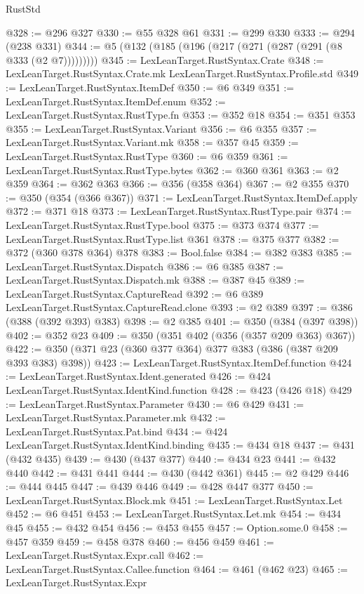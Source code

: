 \begin{lexlean}{RustStd}
\begin{coremodule}
{\begin{coremodule}
{{{{{{{{{{{{@328 := @296 @327
@330 := @55 @328 @61
@331 := @299 @330
@333 := @294 (@238 @331)
@344 := @5 (@132 (@185 (@196 (@217 (@271 (@287 (@291 (@8 @333 (@2 @7)))))))))
@345 := LexLeanTarget.RustSyntax.Crate
@348 := LexLeanTarget.RustSyntax.Crate.mk LexLeanTarget.RustSyntax.Profile.std
@349 := LexLeanTarget.RustSyntax.ItemDef
@350 := @6 @349
@351 := LexLeanTarget.RustSyntax.ItemDef.enum
@352 := LexLeanTarget.RustSyntax.RustType.fn
@353 := @352 @18
@354 := @351 @353
@355 := LexLeanTarget.RustSyntax.Variant
@356 := @6 @355
@357 := LexLeanTarget.RustSyntax.Variant.mk
@358 := @357 @45
@359 := LexLeanTarget.RustSyntax.RustType
@360 := @6 @359
@361 := LexLeanTarget.RustSyntax.RustType.bytes
@362 := @360 @361
@363 := @2 @359
@364 := @362 @363
@366 := @356 (@358 @364)
@367 := @2 @355
@370 := @350 (@354 (@366 @367))
@371 := LexLeanTarget.RustSyntax.ItemDef.apply
@372 := @371 @18
@373 := LexLeanTarget.RustSyntax.RustType.pair
@374 := LexLeanTarget.RustSyntax.RustType.bool
@375 := @373 @374
@377 := LexLeanTarget.RustSyntax.RustType.list @361
@378 := @375 @377
@382 := @372 (@360 @378 @364) @378
@383 := Bool.false
@384 := @382 @383
@385 := LexLeanTarget.RustSyntax.Dispatch
@386 := @6 @385
@387 := LexLeanTarget.RustSyntax.Dispatch.mk
@388 := @387 @45
@389 := LexLeanTarget.RustSyntax.CaptureRead
@392 := @6 @389 LexLeanTarget.RustSyntax.CaptureRead.clone
@393 := @2 @389
@397 := @386 (@388 (@392 @393) @383)
@398 := @2 @385
@401 := @350 (@384 (@397 @398))
@402 := @352 @23
@409 := @350 (@351 @402 (@356 (@357 @209 @363) @367))
@422 := @350 (@371 @23 (@360 @377 @364) @377 @383 (@386 (@387 @209 @393 @383) @398))
@423 := LexLeanTarget.RustSyntax.ItemDef.function
@424 := LexLeanTarget.RustSyntax.Ident.generated
@426 := @424 LexLeanTarget.RustSyntax.IdentKind.function
@428 := @423 (@426 @18)
@429 := LexLeanTarget.RustSyntax.Parameter
@430 := @6 @429
@431 := LexLeanTarget.RustSyntax.Parameter.mk
@432 := LexLeanTarget.RustSyntax.Pat.bind
@434 := @424 LexLeanTarget.RustSyntax.IdentKind.binding
@435 := @434 @18
@437 := @431 (@432 @435)
@439 := @430 (@437 @377)
@440 := @434 @23
@441 := @432 @440
@442 := @431 @441
@444 := @430 (@442 @361)
@445 := @2 @429
@446 := @444 @445
@447 := @439 @446
@449 := @428 @447 @377
@450 := LexLeanTarget.RustSyntax.Block.mk
@451 := LexLeanTarget.RustSyntax.Let
@452 := @6 @451
@453 := LexLeanTarget.RustSyntax.Let.mk
@454 := @434 @45
@455 := @432 @454
@456 := @453 @455
@457 := Option.some.{0}
@458 := @457 @359
@459 := @458 @378
@460 := @456 @459
@461 := LexLeanTarget.RustSyntax.Expr.call
@462 := LexLeanTarget.RustSyntax.Callee.function
@464 := @461 (@462 @23)
@465 := LexLeanTarget.RustSyntax.Expr
}}}}}}}}}}}}
\end{coremodule}}
\end{coremodule}
\end{lexlean}
